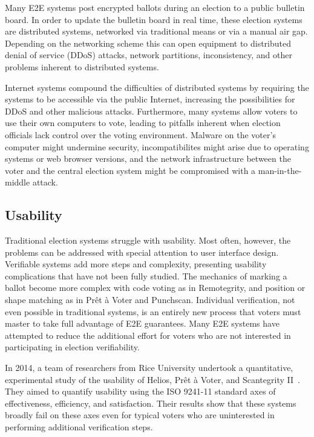 Many E2E systems post encrypted ballots during an election to a public
bulletin board. In order to update the bulletin board in real time,
these election systems are distributed systems, networked via
traditional means or via a manual air gap. Depending on the networking
scheme this can open equipment to distributed denial of service (DDoS)
attacks, network partitions, inconsistency, and other problems
inherent to distributed systems.

Internet systems compound the difficulties of distributed systems by
requiring the systems to be accessible via the public Internet,
increasing the possibilities for DDoS and other malicious
attacks. Furthermore, many systems allow voters to use their own
computers to vote, leading to pitfalls inherent when election
officials lack control over the voting environment. Malware on the
voter's computer might undermine security, incompatibilites might
arise due to operating systems or web browser versions, and the
network infrastructure between the voter and the central election
system might be compromised with a man-in-the-middle attack.

\subsection{Usability}

Traditional election systems struggle with usability. Most often, however, the problems can be addressed with special attention to user interface design. Verifiable
systems add more steps and complexity, presenting usability complications that have not been fully studied. The mechanics of marking a ballot become more complex with
code voting as in Remotegrity, and position or shape matching as in
Prêt à Voter and Punchscan. Individual verification, not even possible
in traditional systems, is an entirely new process that voters must
master to take full advantage of E2E guarantees. Many E2E systems have attempted to reduce the additional effort for voters who are not interested in participating in election verifiability. 

In 2014, a team of researchers from Rice University undertook a
quantitative, experimental study of the usability of Helios, Prêt à
Voter, and Scantegrity II~\cite{acemyan2014usability}. They aimed to
quantify usability using the ISO 9241-11 standard axes of
effectiveness, efficiency, and satisfaction. Their results show that
these systems broadly fail on these axes even for typical voters who
are uninterested in performing additional verification steps.

